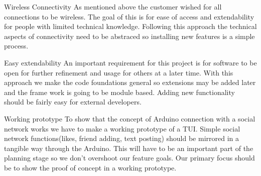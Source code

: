 Wireless Connectivity
As mentioned above the customer wished for all connections to be wireless. The goal of this is for ease of access and extendability for people with limited technical knowledge. Following this approach the technical aspects of connectivity need to be abstraced so installing new features is a simple process.

Easy extendability
An important requirement for this project is for software to be open for further refinement and usage for others at a later time. With this approach we make the code foundations general so extensions may be added later and the frame work is going to be module based. Adding new functionality should be fairly easy for external developers.

Working prototype
To show that the concept of Arduino connection with a social network works we have to make a working prototype of a TUI. Simple social network functions(likes, friend adding, text posting) should be mirrored in a tangible way through the Arduino. This will have to be an important part of the planning stage so we don’t overshoot our feature goals. Our primary focus should be to show the proof of concept in a working prototype.